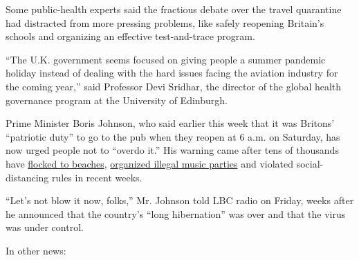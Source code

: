 Some public-health experts said the fractious debate over the travel
quarantine had distracted from more pressing problems, like safely
reopening Britain's schools and organizing an effective test-and-trace
program.

``The U.K. government seems focused on giving people a summer pandemic
holiday instead of dealing with the hard issues facing the aviation
industry for the coming year,'' said Professor Devi Sridhar, the
director of the global health governance program at the University of
Edinburgh.

Prime Minister Boris Johnson, who said earlier this week that it was
Britons' ``patriotic duty'' to go to the pub when they reopen at 6 a.m.
on Saturday, has now urged people not to ``overdo it.'' His warning came
after tens of thousands have
\href{https://www.nytimes3xbfgragh.onion/2020/06/26/world/europe/uk-coronavirus-lockdown.html}{flocked
to beaches},
\href{https://www.nytimes3xbfgragh.onion/2020/06/25/world/europe/brixton-party-police.html}{organized
illegal music parties} and violated social-distancing rules in recent
weeks.

``Let's not blow it now, folks,'' Mr. Johnson told LBC radio on Friday,
weeks after he announced that the country's ``long hibernation'' was
over and that the virus was under control.

In other news:

